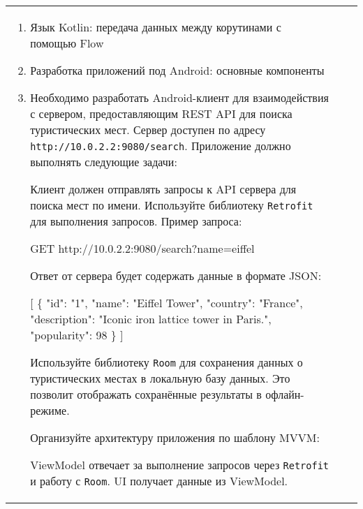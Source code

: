 \documentclass[a4paper]{article}
\begin{document}
\begin{tabular}{!{\vrule width 2pt}p{5cm}|p{6cm}|p{4cm}!{\vrule width 2pt}}
{\begin{minipage}{16cm}
\fontsize{14pt}{16pt}\selectfont\itshape
\begin{enumerate}
    \item Язык Kotlin: передача данных между корутинами с помощью Flow
    \item Разработка приложений под Android: основные компоненты
    \item %

Необходимо разработать Android-клиент для взаимодействия с сервером, предоставляющим REST API для поиска туристических мест. Сервер доступен по адресу \texttt{http://10.0.2.2:9080/search}. Приложение должно выполнять следующие задачи:


Клиент должен отправлять запросы к API сервера для поиска мест по имени. Используйте библиотеку \texttt{Retrofit} для выполнения запросов. Пример запроса:

 GET http://10.0.2.2:9080/search?name=eiffel 

Ответ от сервера будет содержать данные в формате JSON:

 [ \{ "id": "1", "name": "Eiffel Tower", 
    "country": "France", "description": "Iconic iron lattice tower in Paris.", 
    "popularity": 98 \} ] 


Используйте библиотеку \texttt{Room} для сохранения данных о туристических местах в локальную базу данных. Это позволит отображать сохранённые результаты в офлайн-режиме.


Организуйте архитектуру приложения по шаблону MVVM:

ViewModel отвечает за выполнение запросов через \texttt{Retrofit} и работу с \texttt{Room}.
UI получает данные из ViewModel.


\end{enumerate}
\end{minipage}}
\end{tabular}
\end{document}
